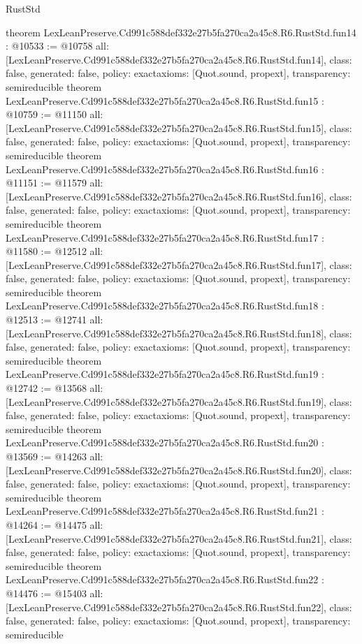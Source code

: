 \begin{lexlean}{RustStd}
\begin{coremodule}
{}
theorem LexLeanPreserve.Cd991c588def332e27b5fa270ca2a45c8.R6.RustStd.fun14 : @10533 := @10758 {
  all: [LexLeanPreserve.Cd991c588def332e27b5fa270ca2a45c8.R6.RustStd.fun14],
  class: false,
  generated: false,
  policy: exact{axioms: [Quot.sound, propext]},
  transparency: semireducible
}
theorem LexLeanPreserve.Cd991c588def332e27b5fa270ca2a45c8.R6.RustStd.fun15 : @10759 := @11150 {
  all: [LexLeanPreserve.Cd991c588def332e27b5fa270ca2a45c8.R6.RustStd.fun15],
  class: false,
  generated: false,
  policy: exact{axioms: [Quot.sound, propext]},
  transparency: semireducible
}
theorem LexLeanPreserve.Cd991c588def332e27b5fa270ca2a45c8.R6.RustStd.fun16 : @11151 := @11579 {
  all: [LexLeanPreserve.Cd991c588def332e27b5fa270ca2a45c8.R6.RustStd.fun16],
  class: false,
  generated: false,
  policy: exact{axioms: [Quot.sound, propext]},
  transparency: semireducible
}
theorem LexLeanPreserve.Cd991c588def332e27b5fa270ca2a45c8.R6.RustStd.fun17 : @11580 := @12512 {
  all: [LexLeanPreserve.Cd991c588def332e27b5fa270ca2a45c8.R6.RustStd.fun17],
  class: false,
  generated: false,
  policy: exact{axioms: [Quot.sound, propext]},
  transparency: semireducible
}
theorem LexLeanPreserve.Cd991c588def332e27b5fa270ca2a45c8.R6.RustStd.fun18 : @12513 := @12741 {
  all: [LexLeanPreserve.Cd991c588def332e27b5fa270ca2a45c8.R6.RustStd.fun18],
  class: false,
  generated: false,
  policy: exact{axioms: [Quot.sound, propext]},
  transparency: semireducible
}
theorem LexLeanPreserve.Cd991c588def332e27b5fa270ca2a45c8.R6.RustStd.fun19 : @12742 := @13568 {
  all: [LexLeanPreserve.Cd991c588def332e27b5fa270ca2a45c8.R6.RustStd.fun19],
  class: false,
  generated: false,
  policy: exact{axioms: [Quot.sound, propext]},
  transparency: semireducible
}
theorem LexLeanPreserve.Cd991c588def332e27b5fa270ca2a45c8.R6.RustStd.fun20 : @13569 := @14263 {
  all: [LexLeanPreserve.Cd991c588def332e27b5fa270ca2a45c8.R6.RustStd.fun20],
  class: false,
  generated: false,
  policy: exact{axioms: [Quot.sound, propext]},
  transparency: semireducible
}
theorem LexLeanPreserve.Cd991c588def332e27b5fa270ca2a45c8.R6.RustStd.fun21 : @14264 := @14475 {
  all: [LexLeanPreserve.Cd991c588def332e27b5fa270ca2a45c8.R6.RustStd.fun21],
  class: false,
  generated: false,
  policy: exact{axioms: [Quot.sound, propext]},
  transparency: semireducible
}
theorem LexLeanPreserve.Cd991c588def332e27b5fa270ca2a45c8.R6.RustStd.fun22 : @14476 := @15403 {
  all: [LexLeanPreserve.Cd991c588def332e27b5fa270ca2a45c8.R6.RustStd.fun22],
  class: false,
  generated: false,
  policy: exact{axioms: [Quot.sound, propext]},
  transparency: semireducible
}
\end{coremodule}
\end{lexlean}
